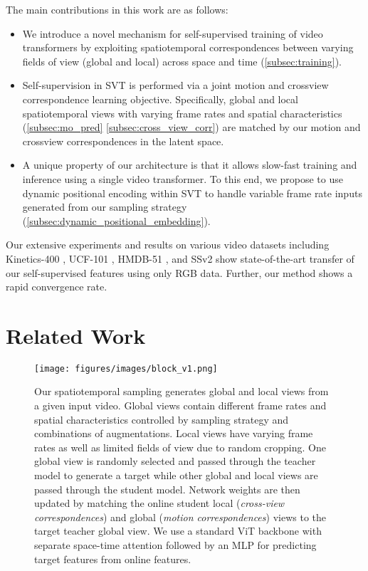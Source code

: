 \documentclass[10pt,twocolumn,letterpaper]{article}
\begin{document}
\noindent The main contributions in this work are as follows:\vspace{-0.5em} 
\begin{itemize}[leftmargin=*,noitemsep, topsep=1.0ex,itemsep=-0.5ex,partopsep=0ex,parsep=1ex]
    \item 	We introduce a novel mechanism for self-supervised training of video transformers	by exploiting spatiotemporal correspondences between 
	varying fields of view (global and local) across space and time (\cref{subsec:training}).   
	\item Self-supervision in SVT is performed via a joint motion and crossview correspondence learning objective. 
	Specifically, global and local spatiotemporal views with varying frame rates and spatial characteristics (\cref{subsec:mo_pred}  \cref{subsec:cross_view_corr}) are matched by our motion and crossview correspondences in the latent space.
	\item 
	A unique property of our architecture is that it allows slow-fast training and inference using a single video transformer. To this end, we propose to use dynamic positional encoding within SVT to handle variable frame rate inputs generated from our sampling strategy (\cref{subsec:dynamic_positional_embedding}). 
\end{itemize}

Our extensive experiments and results on various video datasets including Kinetics-400 \cite{kinetics400}, UCF-101 \cite{soomro2012ucf}, HMDB-51 \cite{kuehne2011hmdb}, and SSv2 \cite{goyal2017something} show state-of-the-art transfer of our self-supervised features using only RGB data. Further, our method shows a rapid convergence rate. \section{Related Work}
\label{sec:related}

\begin{figure*}[t]
	\centering
	\texttt{[image: figures/images/block\_v1.png]}
	\vspace{-2em}
	\caption{Our spatiotemporal sampling generates global and local views from a given input video. Global views contain different frame rates and spatial characteristics controlled by sampling strategy and combinations of augmentations. Local views have varying frame rates as well as limited fields of view due to random cropping. One global view is randomly selected and passed through the teacher model to generate a target while other global and local views are passed through the student model. Network weights are then updated by matching the online student local (\emph{cross-view correspondences}) and global (\emph{motion correspondences}) views to the target teacher global view. We use a standard ViT backbone with separate space-time attention \cite{gberta_2021_ICML} followed by an MLP for predicting target features from online features.
	}
	\label{fig:architecture}
	\vspace{-1em}
\end{figure*}
\end{document}

